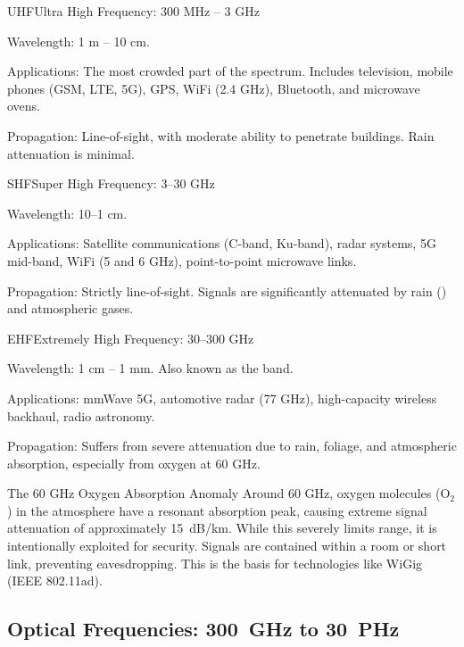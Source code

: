 \begin{spectrumband}{UHF}{Ultra High Frequency: 300 MHz -- 3 GHz}
    \item[Wavelength:] 1 m -- 10 cm.
    \item[Applications:] The most crowded part of the spectrum. Includes television, mobile phones (GSM, LTE, 5G), GPS, WiFi (2.4 GHz), Bluetooth, and microwave ovens.
    \item[Propagation:] Line-of-sight, with moderate ability to penetrate buildings. Rain attenuation is minimal.
\end{spectrumband}

\begin{spectrumband}{SHF}{Super High Frequency: 3--30 GHz}
    \item[Wavelength:] 10--1 cm.
    \item[Applications:] Satellite communications (C-band, Ku-band), radar systems, 5G mid-band, WiFi (5 and 6 GHz), point-to-point microwave links.
    \item[Propagation:] Strictly line-of-sight. Signals are significantly attenuated by rain () and atmospheric gases.
\end{spectrumband}

\begin{spectrumband}{EHF}{Extremely High Frequency: 30--300 GHz}
    \item[Wavelength:] 1 cm -- 1 mm. Also known as the  band.
    \item[Applications:] mmWave 5G, automotive radar (77 GHz), high-capacity wireless backhaul, radio astronomy.
    \item[Propagation:] Suffers from severe attenuation due to rain, foliage, and atmospheric absorption, especially from oxygen at 60 GHz.
\end{spectrumband}

\begin{calloutbox}{The 60 GHz Oxygen Absorption Anomaly}
    Around 60 GHz, oxygen molecules (O$_2$) in the atmosphere have a resonant absorption peak, causing extreme signal attenuation of approximately \qty{15}{dB/km}. While this severely limits range, it is intentionally exploited for security. Signals are contained within a room or short link, preventing eavesdropping. This is the basis for technologies like WiGig (IEEE 802.11ad).
\end{calloutbox}

\subsection{Optical Frequencies: \qty{300}{GHz} to \qty{30}{PHz}}

